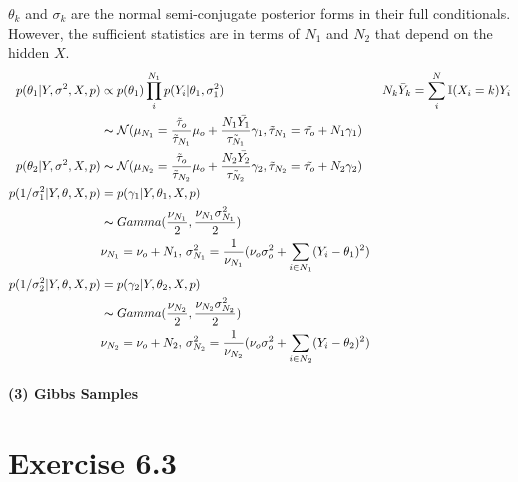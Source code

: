 \documentclass[11pt, letterpaper]{article}
\begin{document}
$\theta_k$ and $\sigma_k$ are the normal semi-conjugate posterior forms in their full conditionals. However, the sufficient statistics are in terms of $N_1$ and $N_2$ that depend on the hidden $X$.
\begin{align*}
    p(\theta_1|Y, \sigma^2, X, p)
        &\propto p(\theta_1) \prod_i^{N_1} p(Y_i|\theta_1, \sigma^2_1) 
            && N_k \bar{Y}_k = \sum_i^N \mathbb{I}(X_i=k) Y_i \\
        &\thicksim \mathcal{N}(
            \mu_{N_1} = 
                \frac{\tilde{\tau}_o}{\tilde{\tau}_{N_1}} \mu_o + \frac{N_1\bar{Y_1}}{\tilde{\tau_{N_1}}}\gamma_1,
            \tilde{\tau}_{N_1} = \tilde{\tau_o} + N_1\gamma_1
        ) \\
    p(\theta_2|Y, \sigma^2, X, p)
        &\thicksim \mathcal{N}(
            \mu_{N_2} = 
                \frac{\tilde{\tau}_o}{\tilde{\tau}_{N_2}} \mu_o + \frac{N_2\bar{Y_2}}{\tilde{\tau_{N_2}}}\gamma_2,
            \tilde{\tau}_{N_2} = \tilde{\tau_o} + N_2\gamma_2
        ) \\
    p(1/\sigma_1^2|Y, \theta, X, p) &= p(\gamma_1|Y, \theta_1, X, p) \\
        &\thicksim Gamma(\frac{\nu_{N_1}}{2}, \frac{\nu_{N_1}\sigma_{N_1}^2}{2}) \\
        &\nu_{N_1} = \nu_o + N_1, \, \sigma_{N_1}^2 = \frac{1}{\nu_{N_1}}(\nu_o\sigma_o^2+\sum_{i\in N_1}(Y_i-\theta_1)^2) \\
    p(1/\sigma_2^2|Y, \theta, X, p) &= p(\gamma_2|Y, \theta_2, X, p) \\
        &\thicksim Gamma(\frac{\nu_{N_2}}{2}, \frac{\nu_{N_2}\sigma_{N_2}^2}{2}) \\
        &\nu_{N_2} = \nu_o + N_2, \, \sigma_{N_2}^2 = \frac{1}{\nu_{N_2}}(\nu_o\sigma_o^2+\sum_{i\in N_2}(Y_i-\theta_2)^2) \\
\end{align*}

\paragraph{(3) Gibbs Samples}


\section{Exercise 6.3}
\end{document}

